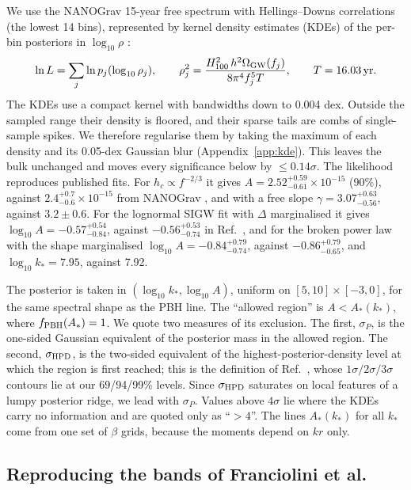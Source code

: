 \documentclass{article}
\newcommand{\fpbh}{f_{\rm PBH}}
\begin{document}
We use the NANOGrav 15-year free spectrum with Hellings--Downs correlations (the lowest 14 bins),
represented by kernel density estimates (KDEs) of the per-bin posteriors in $\log_{10}\rho$
\cite{Lamb,PTArcade}:
\begin{equation}
\ln L=\sum_j\ln p_j(\log_{10}\rho_j),\qquad
\rho_j^2=\frac{H_{100}^2\,h^2\Omega_{\rm GW}(f_j)}{8\pi^4f_j^5T},\qquad T=16.03\,{\rm yr}.
\label{eq:like}
\end{equation}
The KDEs use a compact kernel with bandwidths down to 0.004 dex. Outside the sampled range their
density is floored, and their sparse tails are combs of single-sample spikes. We therefore
regularise them by taking the maximum of each density and its 0.05-dex Gaussian blur
(Appendix~\ref{app:kde}). This leaves the bulk unchanged and moves every significance below by
$\le0.14\sigma$. The likelihood reproduces published fits. For $h_c\propto f^{-2/3}$ it gives
$A=2.52^{+0.59}_{-0.61}\times10^{-15}$ (90\%), against $2.4^{+0.7}_{-0.6}\times10^{-15}$ from
NANOGrav \cite{NG15gwb}, and with a free slope $\gamma=3.07^{+0.63}_{-0.56}$, against
$3.2\pm0.6$. For the lognormal SIGW fit with $\Delta$ marginalised it gives
$\log_{10}A=-0.57^{+0.54}_{-0.84}$, against $-0.56^{+0.53}_{-0.74}$ in Ref.~\cite{FIVT23}, and for
the broken power law with the shape marginalised $\log_{10}A=-0.84^{+0.79}_{-0.74}$, against
$-0.86^{+0.79}_{-0.65}$, and $\log_{10}k_*=7.95$, against 7.92.

The posterior is taken in $(\log_{10}k_*,\log_{10}A)$, uniform on $[5,10]\times[-3,0]$, for the
same spectral shape as the PBH line. The ``allowed region'' is $A<A_*(k_*)$, where
$\fpbh(A_*)=1$. We quote two measures of its exclusion. The first, $\sigma_P$, is the one-sided
Gaussian equivalent of the posterior mass in the allowed region. The second, $\sigma_{\rm HPD}$,
is the two-sided equivalent of the highest-posterior-density level at which the region is first
reached; this is the definition of Ref.~\cite{FIVT23}, whose $1\sigma/2\sigma/3\sigma$ contours
lie at our 69/94/99\% levels. Since $\sigma_{\rm HPD}$ saturates on local features of a lumpy
posterior ridge, we lead with $\sigma_P$. Values above $4\sigma$ lie where the KDEs carry no
information and are quoted only as ``$>4$''. The lines $A_*(k_*)$ for all $k_*$ come from one set
of $\beta$ grids, because the moments depend on $kr$ only.

\subsection{Reproducing the bands of Franciolini et al.}
\end{document}
